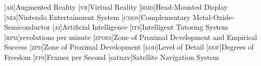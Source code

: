 \newcommand{\clearemptydoublepage}{\newpage{\pagestyle{empty}\cleardoublepage}}



[\textsc{ar}]{Augmented Reality}
[\textsc{vr}]{Virtual Reality}
[\textsc{hmd}]{Head-Mounted Display}
[\textsc{nes}]{Nintendo Entertainment System}
[\textsc{cmos}]{Complementary Metal-Oxide-Semiconductor}
[\textsc{ai}]{Artificial Intelligence}
[\textsc{its}]{Intelligent Tutoring System}
[\textsc{rpm}]{revolutions per minute}
[\textsc{zpdes}]{Zone of Proximal Development and Empirical Success}
[\textsc{zpd}]{Zone of Proximal Development}
[\textsc{lod}]{Level of Detail}
[\textsc{dof}]{Degrees of Freedom}
[\textsc{fps}]{Frames per Second}
[satnav]{Satellite Navigation System}

\newcommand{\refsec}[1]{Section~\ref{sec:#1}}
\newcommand{\refeq}[1]{Eq.~(\ref{eq:#1})}
\newcommand{\reffig}[1]{Figure~\ref{fig:#1}}
\newcommand{\reftab}[1]{Table~\ref{tab:#1}}
\newcommand{\refalg}[1]{Alg.~(\ref{alg:#1})}


\newcommand{\todo}[1]{\textcolor{red}{TODO: #1}}
